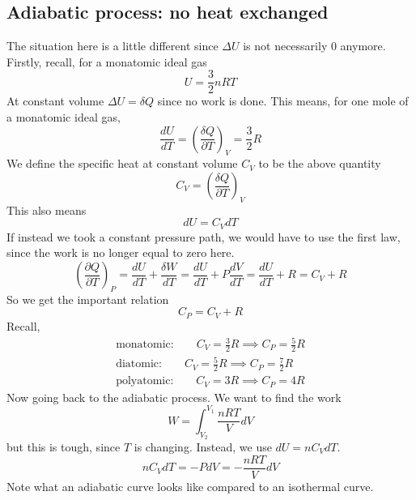 \documentclass{report}
\numberwithin{equation}{section}
\newcommand{\pd}[2]{\frac{\partial #1}{\partial #2}}
\begin{document}
\subsection{Adiabatic process: no heat exchanged}
The situation here is a little different since $\Delta U$ is not necessarily 0 anymore. Firstly, recall, for a monatomic ideal gas 
\begin{equation*}
    U = \frac{3}{2}nRT
\end{equation*}
At constant volume $\Delta U = \delta Q$ since no work is done. This means, for one mole of a monatomic ideal gas,
\begin{equation*}
    \frac{dU}{dT} = \left(\frac{\delta Q}{\partial T}\right)_V = \frac{3}{2}R
\end{equation*}
We define the specific heat at constant volume $C_V$ to be the above quantity 
\begin{equation}
    C_V = \left(\frac{\delta Q}{\partial T}\right)_V
\end{equation}
This also means 
\begin{equation}
    dU = C_VdT
\end{equation}
If instead we took a constant pressure path, we would have to use the first law, since the work is no longer equal to zero here. 
\begin{equation*}
    \left(\pd{Q}{T}\right)_P = \frac{dU}{dT} + \frac{\delta W}{dT} = \frac{dU}{dT}+P\frac{dV}{dT} = \frac{dU}{dT}+ R = C_V+ R
\end{equation*}
So we get the important relation 
\begin{equation*}
    C_P = C_V + R
\end{equation*}
Recall, 
\begin{align*}
    \text{monatomic:}\qquad C_V = \frac{3}{2}R \implies C_P = \frac{5}{2}R\\
    \text{diatomic:}\qquad C_V = \frac{5}{2}R\implies C_P = \frac{7}{2}R\\
    \text{polyatomic:}\qquad C_V = 3R \implies C_P = 4R
\end{align*}
Now going back to the adiabatic process. We want to find the work
\begin{equation*}
    W = \int^{V_1}_{V_2}\frac{nRT}{V}dV 
\end{equation*}
but this is tough, since $T$ is changing. Instead, we use $dU = nC_V dT$. 
\begin{equation*}
    nC_V dT = -PdV = -\frac{nRT}{V}dV
\end{equation*}
Note what an adiabatic curve looks like compared to an isothermal curve.
\end{document}
